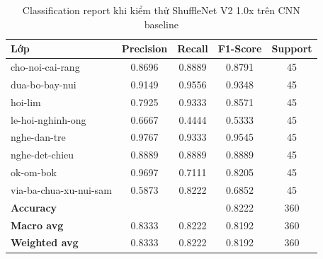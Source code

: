 \begin{table}[H]
\centering
\renewcommand{\arraystretch}{1.0}
\caption{Classification report khi kiểm thử ShuffleNet V2 1.0x trên CNN baseline}
\label{tab:CRShuffleNetV2X1.0}
\begin{tabular}{lcccc}
\hline
\textbf{Lớp} & \textbf{Precision} & \textbf{Recall} & \textbf{F1-Score} & \textbf{Support} \\
\hline
cho-noi-cai-rang          & 0.8696 & 0.8889 & 0.8791 & 45 \\
dua-bo-bay-nui             & 0.9149 & 0.9556 & 0.9348 & 45 \\
hoi-lim                    & 0.7925 & 0.9333 & 0.8571 & 45 \\
le-hoi-nghinh-ong          & 0.6667 & 0.4444 & 0.5333 & 45 \\
nghe-dan-tre               & 0.9767 & 0.9333 & 0.9545 & 45 \\
nghe-det-chieu             & 0.8889 & 0.8889 & 0.8889 & 45 \\
ok-om-bok                  & 0.9697 & 0.7111 & 0.8205 & 45 \\
via-ba-chua-xu-nui-sam     & 0.5873 & 0.8222 & 0.6852 & 45 \\
\hline
\textbf{Accuracy}          & & & 0.8222 & 360 \\
\textbf{Macro avg}         & 0.8333 & 0.8222 & 0.8192 & 360 \\
\textbf{Weighted avg}      & 0.8333 & 0.8222 & 0.8192 & 360 \\
\hline
\end{tabular}
\end{table}

